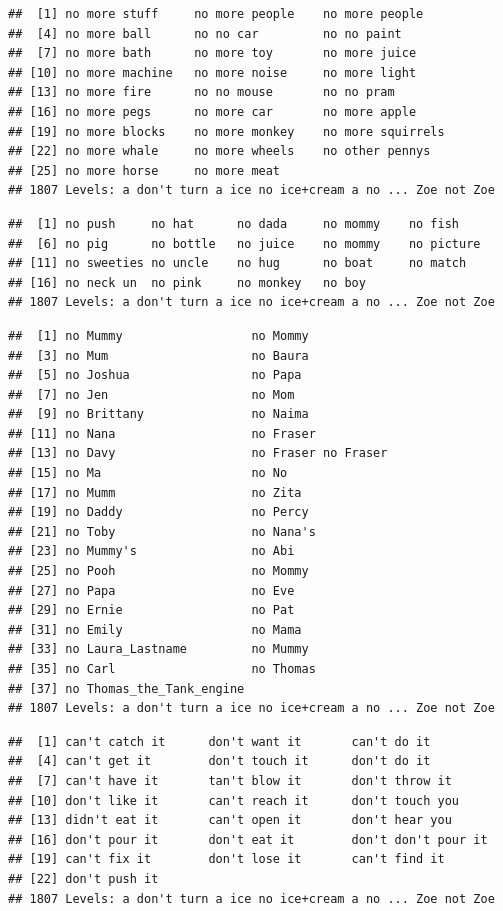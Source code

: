 \documentclass[man]{apa6}
\begin{document}
\begin{verbatim}
##  [1] no more stuff     no more people    no more people   
##  [4] no more ball      no no car         no no paint      
##  [7] no more bath      no more toy       no more juice    
## [10] no more machine   no more noise     no more light    
## [13] no more fire      no no mouse       no no pram       
## [16] no more pegs      no more car       no more apple    
## [19] no more blocks    no more monkey    no more squirrels
## [22] no more whale     no more wheels    no other pennys  
## [25] no more horse     no more meat     
## 1807 Levels: a don't turn a ice no ice+cream a no ... Zoe not Zoe
\end{verbatim}

\begin{verbatim}
##  [1] no push     no hat      no dada     no mommy    no fish    
##  [6] no pig      no bottle   no juice    no mommy    no picture 
## [11] no sweeties no uncle    no hug      no boat     no match   
## [16] no neck un  no pink     no monkey   no boy     
## 1807 Levels: a don't turn a ice no ice+cream a no ... Zoe not Zoe
\end{verbatim}

\begin{verbatim}
##  [1] no Mummy                  no Mommy                 
##  [3] no Mum                    no Baura                 
##  [5] no Joshua                 no Papa                  
##  [7] no Jen                    no Mom                   
##  [9] no Brittany               no Naima                 
## [11] no Nana                   no Fraser                
## [13] no Davy                   no Fraser no Fraser      
## [15] no Ma                     no No                    
## [17] no Mumm                   no Zita                  
## [19] no Daddy                  no Percy                 
## [21] no Toby                   no Nana's                
## [23] no Mummy's                no Abi                   
## [25] no Pooh                   no Mommy                 
## [27] no Papa                   no Eve                   
## [29] no Ernie                  no Pat                   
## [31] no Emily                  no Mama                  
## [33] no Laura_Lastname         no Mummy                 
## [35] no Carl                   no Thomas                
## [37] no Thomas_the_Tank_engine
## 1807 Levels: a don't turn a ice no ice+cream a no ... Zoe not Zoe
\end{verbatim}

\begin{verbatim}
##  [1] can't catch it      don't want it       can't do it        
##  [4] can't get it        don't touch it      don't do it        
##  [7] can't have it       tan't blow it       don't throw it     
## [10] don't like it       can't reach it      don't touch you    
## [13] didn't eat it       can't open it       don't hear you     
## [16] don't pour it       don't eat it        don't don't pour it
## [19] can't fix it        don't lose it       can't find it      
## [22] don't push it      
## 1807 Levels: a don't turn a ice no ice+cream a no ... Zoe not Zoe
\end{verbatim}
\end{document}
